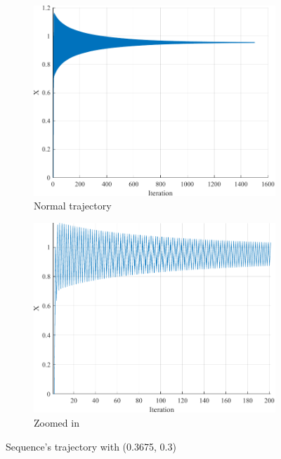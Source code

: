 \begin{figure}[htpb]
	\centering
	\begin{subfigure}{0.4\textwidth}
		\centering
		\includegraphics[width=\textwidth]{../Problem 3/prob3_(c)_a_0.365_b_0.3.pdf}
		\caption{Normal trajectory}
	\end{subfigure}
	\begin{subfigure}{0.4\textwidth}
		\centering
		\includegraphics[width=\textwidth]{../Problem 3/prob3_(c)_a_0.365_b_0.3_zoomed.pdf}
		\caption{Zoomed in}
	\end{subfigure}
	\caption{Sequence's trajectory with (0.3675, 0.3)}
\end{figure}

